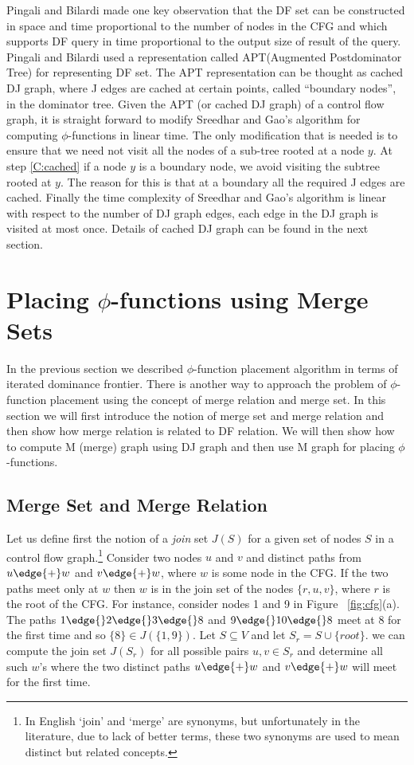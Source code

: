 Pingali and Bilardi made one key observation that the DF set 
can be constructed in space and 
time proportional to the number of nodes in the CFG and which supports DF query 
in time proportional to the output size of result of the query.  Pingali and Bilardi used
a representation called APT(Augmented Postdominator Tree) for representing DF set. 
The APT representation can be
thought as cached DJ graph, where J edges are cached at certain points, called 
``boundary nodes'', in the dominator tree. Given the APT 
(or cached DJ graph) of a control flow graph, it is straight forward to 
modify  Sreedhar and Gao's algorithm for computing $\phi$-functions in linear time. 
 The only modification that is needed is to
ensure that we need not visit all the nodes of a sub-tree rooted at a node
$y$. At step \ref{C:cached} if a node $y$ is a boundary node, we avoid visiting 
the subtree rooted at $y$. The reason for this is that at a boundary all the
required J edges are cached. 
Finally the time complexity of Sreedhar and Gao's algorithm is linear with respect to the number
of DJ graph edges, each edge in the DJ graph is visited at most
once. Details of cached DJ graph can be found in the next section.



\section{Placing $\phi$-functions using Merge Sets}

In the previous section we described $\phi$-function placement algorithm in terms 
of iterated dominance frontier. There is another way to approach the problem
of $\phi$-function placement using the concept of merge relation and merge set. In this section
we will first introduce the notion of merge set and merge relation and then show
how merge relation is related to DF relation. We will then show how to compute
M (merge) graph using DJ graph and then use M graph for placing $\phi$-functions.

\subsection{Merge Set and Merge Relation}

Let us
define first the notion of a {\em join} set $J(S)$
 for a given set of nodes  $S$ in a control flow
graph.\footnote{In English `join' and `merge' are synonyms, 
but unfortunately
in the literature, due to lack of  better terms, these two synonyms are used to mean
distinct but related concepts.} Consider two nodes $u$ and $v$ and distinct 
paths from $u \edge{+} w$ and $v \edge{+} w$, where $w$ is some node in the CFG. If the 
two paths meet only at $w$ then $w$ is in the join set of the nodes $\{r, u, v\}$,
where  $r$ is the root of the CFG. 
For instance, consider nodes 1 and 9 in Figure ~\ref{fig:cfg}(a).
The paths $1 \edge{} 2 \edge{} 3 \edge{} 8$ and $9 \edge{} 10 \edge{} 8$ meet at $8$ 
for the first time and so $\{8\} \in J(\{1,9\})$. Let $S \subseteq V$ and let
$S_r = S \cup \{root \}$. 
we can compute the join set $J(S_r)$ for all possible pairs $u, v \in S_r$ and determine
all such $w$'s where the two distinct paths $u \edge{+} w$ and $v \edge{+} w$ will
meet for the first time. 

